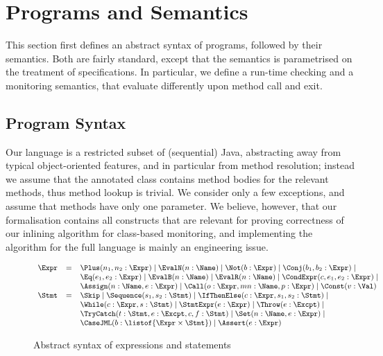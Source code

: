 \section{Programs and Semantics}\label{SecProgram}

This section first defines an abstract syntax of programs, followed by
their semantics. Both are fairly standard, except that the semantics
is parametrised on the treatment of specifications. In particular, we
define a run-time checking and a monitoring semantics, that evaluate
differently upon method call and exit.


\subsection{Program Syntax}\label{SecSyntax}
Our language is a restricted subset of (sequential) Java, abstracting
away from typical object-oriented features, and in particular
from method resolution; instead we assume that
the annotated class contains method bodies for the relevant methods,
thus method lookup is trivial. We consider
only a few exceptions, and assume that methods have only one
parameter. We believe, however, that our formalisation contains all
constructs that are relevant for proving correctness of our inlining
algorithm for class-based monitoring, and implementing the
algorithm for the full language is mainly an engineering issue.

\begin{figure}[t]
\[{\small
\begin{array}{rcl}
\Expr & = & \Plus(n_1, n_2 : \Expr) \mid
            \EvalN(n : \Name) \mid
            \Not(b : \Expr) \mid
            \Conj(b_1, b_2 : \Expr) \mid \\
      &   & \Eq(e_1, e_2 : \Expr) \mid
            \EvalB(n : \Name) \mid
            \EvalR(n : \Name) \mid
            \CondExpr(c, e_1, e_2 : \Expr) \mid\\
      &   & \Assign(n : \Name, e : \Expr) \mid
            \Call(o : \Expr, mn : \Name, p : \Expr) \mid
            \Const(v : \Val) \\
\Stmt & = & \Skip \mid
            \Sequence(s_1, s_2 : \Stmt) \mid
            \IfThenElse(c : \Expr, s_1, s_2 : \Stmt) \mid\\
      &   & \While(c : \Expr, s : \Stmt) \mid
            \StmtExpr(e : \Expr) \mid
            \Throw(e : \Excpt) \mid\\
      &   & \TryCatch(t: \Stmt, e : \Excpt, c, f : \Stmt) \mid
            \Set(n : \Name, e : \Expr) \mid\\
      &   & \CaseJML(b : \listof{\Expr \times \Stmt}) \mid
            \Assert(e : \Expr)
\end{array}}
\]
\caption{Abstract syntax of expressions and statements}
\label{FigExprStmt}
\end{figure}

